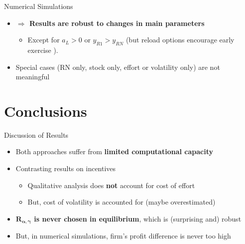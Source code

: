\documentclass[compress]{beamer}
\begin{document}
\begin{frame}{Numerical Simulations}
    \begin{itemize}
        \item \textbf{ $\Rightarrow$ Results are robust to changes in main parameters }%
        \begin{itemize}
            \item Except for $a_L > 0$ or $y_{R1} > y_{RN}$ (but reload options encourage early exercise \citep{hemmer1998optimal}).
        \end{itemize}
        \item Special cases (RN only, stock only, effort or volatility only) are not meaningful
    \end{itemize}
\end{frame}



\section{Conclusions}
\begin{frame}{Discussion of Results}
    \begin{itemize}
        \item Both approaches suffer from \textbf{limited computational capacity}
        \pause
        \item Contrasting results on incentives 
        \begin{itemize}
            \pause
            \item Qualitative analysis does \textbf{not} account for cost of effort
            \pause
            \item But, cost of volatility is accounted for (maybe overestimated)
        \end{itemize}
        \pause
        \item \textbf{$\boldsymbol{R_{\alpha, \gamma}}$ is never chosen in equilibrium}, which is (surprising and) robust
        \pause
        \item But, in numerical simulations, firm's profit difference is never too high
    \end{itemize}
\end{frame}
\end{document}
